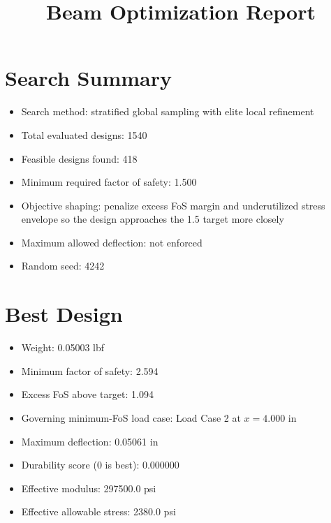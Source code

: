 \documentclass[11pt]{article}
\title{Beam Optimization Report}
\date{}
\begin{document}
\maketitle

\section*{Search Summary}
\begin{itemize}
\item Search method: stratified global sampling with elite local refinement
\item Total evaluated designs: 1540
\item Feasible designs found: 418
\item Minimum required factor of safety: 1.500
\item Objective shaping: penalize excess FoS margin and underutilized stress envelope so the design approaches the 1.5 target more closely
\item Maximum allowed deflection: not enforced
\item Random seed: 4242
\end{itemize}

\section*{Best Design}
\begin{itemize}
\item Weight: 0.05003 lbf
\item Minimum factor of safety: 2.594
\item Excess FoS above target: 1.094
\item Governing minimum-FoS load case: Load Case 2 at $x=4.000$ in
\item Maximum deflection: 0.05061 in
\item Durability score (0 is best): 0.000000
\item Effective modulus: 297500.0 psi
\item Effective allowable stress: 2380.0 psi
\end{itemize}
\end{document}
